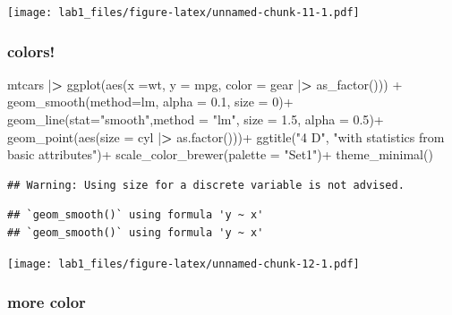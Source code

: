 \documentclass[
]{article}
\newenvironment{Shaded}{\begin{snugshade}}{\end{snugshade}}
\newcommand{\AttributeTok}[1]{\textcolor[rgb]{0.77,0.63,0.00}{#1}}
\newcommand{\DecValTok}[1]{\textcolor[rgb]{0.00,0.00,0.81}{#1}}
\newcommand{\ErrorTok}[1]{\textcolor[rgb]{0.64,0.00,0.00}{\textbf{#1}}}
\newcommand{\FloatTok}[1]{\textcolor[rgb]{0.00,0.00,0.81}{#1}}
\newcommand{\FunctionTok}[1]{\textcolor[rgb]{0.00,0.00,0.00}{#1}}
\newcommand{\NormalTok}[1]{#1}
\newcommand{\SpecialCharTok}[1]{\textcolor[rgb]{0.00,0.00,0.00}{#1}}
\newcommand{\StringTok}[1]{\textcolor[rgb]{0.31,0.60,0.02}{#1}}
\begin{document}
\texttt{[image: lab1\_files/figure-latex/unnamed-chunk-11-1.pdf]}

\hypertarget{colors}{%
\subsubsection{colors!}\label{colors}}

\begin{Shaded}
\begin{Highlighting}[]
\NormalTok{mtcars }\SpecialCharTok{|}\ErrorTok{\textgreater{}} 
\FunctionTok{ggplot}\NormalTok{(}\FunctionTok{aes}\NormalTok{(}\AttributeTok{x =}\NormalTok{wt, }\AttributeTok{y =}\NormalTok{ mpg, }
           \AttributeTok{color =}\NormalTok{ gear }\SpecialCharTok{|}\ErrorTok{\textgreater{}} \FunctionTok{as\_factor}\NormalTok{())) }\SpecialCharTok{+}
  \FunctionTok{geom\_smooth}\NormalTok{(}\AttributeTok{method=}\StringTok{\textquotesingle{}lm\textquotesingle{}}\NormalTok{, }\AttributeTok{alpha =} \FloatTok{0.1}\NormalTok{, }\AttributeTok{size =} \DecValTok{0}\NormalTok{)}\SpecialCharTok{+}
  \FunctionTok{geom\_line}\NormalTok{(}\AttributeTok{stat=}\StringTok{"smooth"}\NormalTok{,}\AttributeTok{method =} \StringTok{"lm"}\NormalTok{, }\AttributeTok{size  =} \FloatTok{1.5}\NormalTok{, }\AttributeTok{alpha =} \FloatTok{0.5}\NormalTok{)}\SpecialCharTok{+}
  \FunctionTok{geom\_point}\NormalTok{(}\FunctionTok{aes}\NormalTok{(}\AttributeTok{size =}\NormalTok{ cyl }\SpecialCharTok{|}\ErrorTok{\textgreater{}} \FunctionTok{as.factor}\NormalTok{()))}\SpecialCharTok{+}
  \FunctionTok{ggtitle}\NormalTok{(}\StringTok{"4 D"}\NormalTok{, }\StringTok{"with statistics from basic attributes"}\NormalTok{)}\SpecialCharTok{+}
  \FunctionTok{scale\_color\_brewer}\NormalTok{(}\AttributeTok{palette =} \StringTok{"Set1"}\NormalTok{)}\SpecialCharTok{+}
  \FunctionTok{theme\_minimal}\NormalTok{()}
\end{Highlighting}
\end{Shaded}

\begin{verbatim}
## Warning: Using size for a discrete variable is not advised.
\end{verbatim}

\begin{verbatim}
## `geom_smooth()` using formula 'y ~ x'
## `geom_smooth()` using formula 'y ~ x'
\end{verbatim}

\texttt{[image: lab1\_files/figure-latex/unnamed-chunk-12-1.pdf]}

\hypertarget{more-color}{%
\subsubsection{more color}\label{more-color}}
\end{document}
